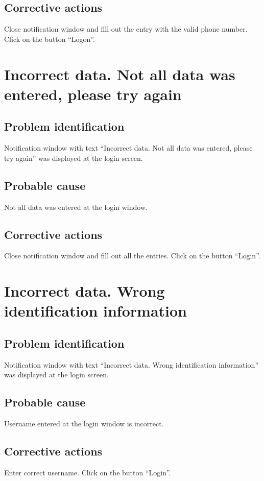 \subsection{Corrective actions}
Close notification window and fill out the entry with the valid phone number.
Click on the button ``Logon''.


\section{Incorrect data. Not all data was entered, please try again}

\subsection{Problem identification}
Notification window with text ``Incorrect data. Not all data was entered, please
try again'' was displayed at the login screen.

\subsection{Probable cause}
Not all data was entered at the login window.

\subsection{Corrective actions}
Close notification window and fill out all the entries. Click on the button
``Login''.


\section{Incorrect data. Wrong identification information}

\subsection{Problem identification}
Notification window with text ``Incorrect data. Wrong identification
information'' was displayed at the login screen.

\subsection{Probable cause}
Username entered at the login window is incorrect.

\subsection{Corrective actions}
Enter correct username. Click on the button ``Login''.


